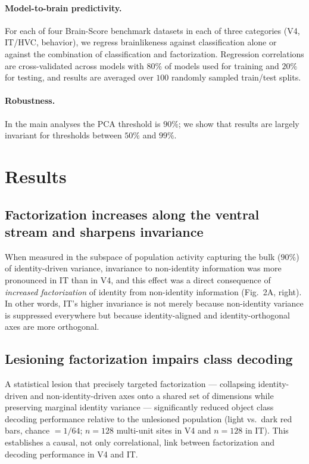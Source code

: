 \documentclass[11pt]{article}
\begin{document}
\paragraph{Model-to-brain predictivity.} For each of four Brain-Score \cite{schrimpf2020brainscore} benchmark datasets in each of three categories (V4, IT/HVC, behavior), we regress brainlikeness against classification alone or against the combination of classification and factorization. Regression correlations are cross-validated across models with $80\%$ of models used for training and $20\%$ for testing, and results are averaged over $100$ randomly sampled train/test splits.

\paragraph{Robustness.} In the main analyses the PCA threshold is $90\%$; we show that results are largely invariant for thresholds between $50\%$ and $99\%$.

\section{Results}

\subsection{Factorization increases along the ventral stream and sharpens invariance}
When measured in the subspace of population activity capturing the bulk ($90\%$) of identity-driven variance, invariance to non-identity information was more pronounced in IT than in V4, and this effect was a direct consequence of \emph{increased factorization} of identity from non-identity information (Fig.~2A, right). In other words, IT's higher invariance is not merely because non-identity variance is suppressed everywhere but because identity-aligned and identity-orthogonal axes are more orthogonal.

\subsection{Lesioning factorization impairs class decoding}
A statistical lesion that precisely targeted factorization --- collapsing identity-driven and non-identity-driven axes onto a shared set of dimensions while preserving marginal identity variance --- significantly reduced object class decoding performance relative to the unlesioned population (light vs.\ dark red bars, chance $= 1/64$; $n = 128$ multi-unit sites in V4 and $n = 128$ in IT). This establishes a causal, not only correlational, link between factorization and decoding performance in V4 and IT.
\end{document}
